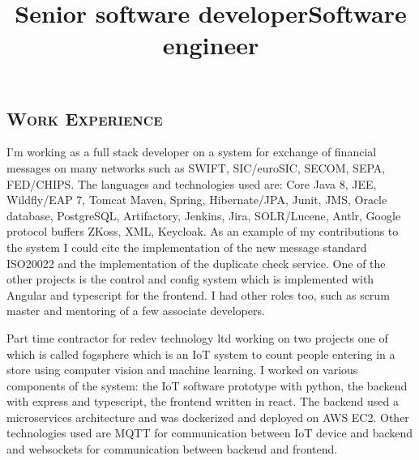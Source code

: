 \begin{resume}
        \section{\textsc{Work Experience}}
        \title{Senior software developer}
        \begin{position}
            I'm working as a full stack developer on a system for exchange of financial messages on many networks such as SWIFT, SIC/euroSIC, SECOM, SEPA, FED/CHIPS.
            The languages and technologies used are: %
            Core Java 8, JEE,
            Wildfly/EAP 7, Tomcat
            Maven, Spring, Hibernate/JPA,
            Junit,
            JMS,
            Oracle database, PostgreSQL,
            Artifactory,
            Jenkins,
            Jira,
            SOLR/Lucene,
            Antlr,
            Google protocol buffers
            ZKoss,
            XML,
            Keycloak.
            As an example of my contributions to the system I could cite the implementation of the new message standard ISO20022 and the implementation of the duplicate check service.
            One of the other projects is the control and config system which is implemented with Angular and typescript for the frontend.
            I had other roles too, such as scrum master and mentoring of a few associate developers.
        \end{position}
        \title{Software engineer}
        \begin{position}
            Part time contractor for redev technology ltd working on two projects one of which is called fogsphere
            which is an IoT system to count people entering in a store using computer vision and machine learning.
            I worked on various components of the system:
            the IoT software prototype with python,
            the backend with express and typescript,
            the frontend written in react.
            The backend used a microservices architecture and was dockerized and deployed on AWS EC2.
            Other technologies used are MQTT for communication between IoT device and backend and websockets for communication between backend and frontend.
        \end{position}

\end{resume}
